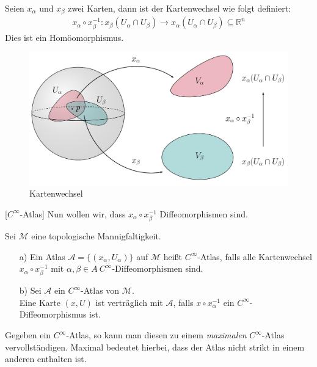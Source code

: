 \begin{defs}[Kartenwechsel]
Seien $x_{\alpha}$ und $x_{\beta}$ zwei Karten, dann ist der Kartenwechsel wie folgt definiert: \\
\begin{align}
x_{\alpha}\circ x_{\beta}^{-1}: x_{\beta}(U_{\alpha}\cap U_{\beta}) \rightarrow x_{\alpha}(U_{\alpha}\cap U_{\beta}) \subseteq \mathbb{R}^n
\end{align}
Dies ist ein Homöomorphismus.

\begin{figure}[H]
\centering
\includegraphics[width=1.0\linewidth]{figures/tikz/map_change.pdf}
\caption{Kartenwechsel}
\label{img:kartenwechsel}
\end{figure} 

\end{defs}[$C^{\infty}$-Atlas]
Nun wollen wir, dass $x_{\alpha}\circ x_{\beta}^{-1}$ Diffeomorphismen sind.
\begin{defs}
Sei $ \mathcal{M}$ eine topologische Mannigfaltigkeit.
\begin{enumerate}
	\item[a)] Ein Atlas $\mathcal{A} = \{(x_{\alpha},U_{\alpha})\}$ auf $\mathcal{M}$ heißt $C^{\infty}$-Atlas, falls alle Kartenwechsel $x_{\alpha}\circ x_{\beta}^{-1}$ mit $\alpha, \beta \in A \ C^{\infty}$-Diffeomorphismen sind.
	\item[b)] Sei $\mathcal{A}$ ein $C^{\infty}$-Atlas von $\mathcal{M}$. \\
	Eine Karte $(x,U)$ ist verträglich mit $\mathcal{A}$, falls $x \circ x_\alpha^{-1}$ ein $C^{\infty}$-Diffeomorphismus ist.
\end{enumerate}
\end{defs}
Gegeben ein $C^{\infty}$-Atlas, so kann man diesen zu einem \textit{maximalen} $C^{\infty}$-Atlas vervollständigen. Maximal bedeutet hierbei, dass der Atlas nicht strikt in einem anderen enthalten ist.

